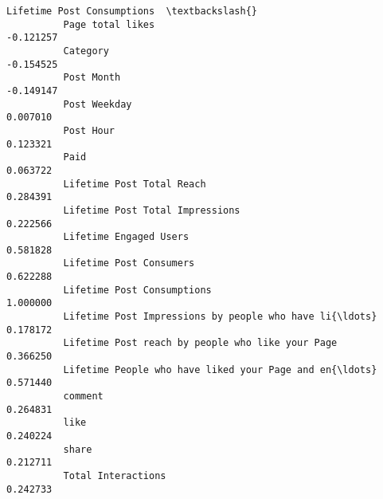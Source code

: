 \documentclass[11pt]{article}
\begin{document}
\begin{Verbatim}[commandchars=\\\{\}]
                                                              Lifetime Post Consumptions  \textbackslash{}
          Page total likes                                                     -0.121257   
          Category                                                             -0.154525   
          Post Month                                                           -0.149147   
          Post Weekday                                                          0.007010   
          Post Hour                                                             0.123321   
          Paid                                                                  0.063722   
          Lifetime Post Total Reach                                             0.284391   
          Lifetime Post Total Impressions                                       0.222566   
          Lifetime Engaged Users                                                0.581828   
          Lifetime Post Consumers                                               0.622288   
          Lifetime Post Consumptions                                            1.000000   
          Lifetime Post Impressions by people who have li{\ldots}                    0.178172   
          Lifetime Post reach by people who like your Page                      0.366250   
          Lifetime People who have liked your Page and en{\ldots}                    0.571440   
          comment                                                               0.264831   
          like                                                                  0.240224   
          share                                                                 0.212711   
          Total Interactions                                                    0.242733   
          

\end{Verbatim}
\end{document}
